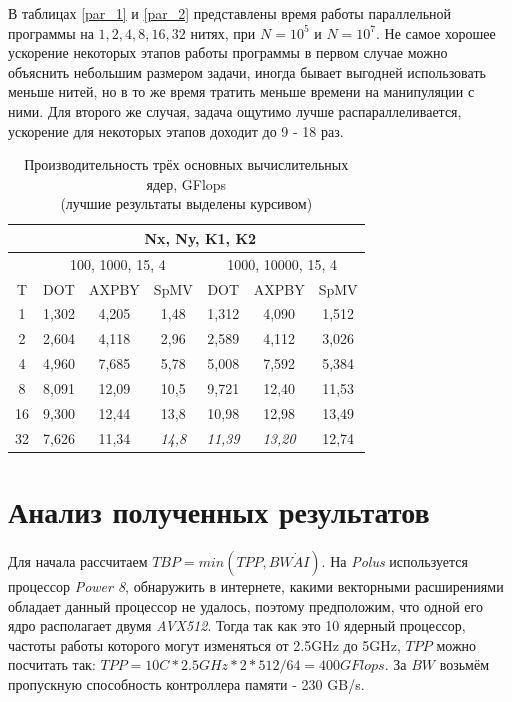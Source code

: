 		В таблицах \ref{par_1} и \ref{par_2} представлены время работы параллельной программы на \(1, 2, 4, 8, 16, 32\) нитях, при \(N = 10^5\) и \(N = 10^7\). Не самое хорошее ускорение некоторых этапов работы программы в первом случае можно объяснить небольшим размером задачи, иногда бывает выгодней использовать меньше нитей, но в то же время тратить меньше времени на манипуляции с ними. Для второго же случая, задача ощутимо лучше распараллеливается, ускорение для некоторых этапов доходит до 9 - 18 раз.
		\begin{table}[H]
			\begin{tabular}{|c||c|c|c|c|c|c|}
				\hline
				& \multicolumn{6}{|c|}{Nx, Ny, K1, K2} \\ \hline
				   & \multicolumn{3}{c|}{100, 1000, 15, 4} & \multicolumn{3}{c|}{1000, 10000, 15, 4} \\ \hline
				T  & DOT   & AXPBY &  SpMV &   DOT & AXPBY & SpMV \\ \hline
				1  & 1,302 & 4,205 & 1,48  & 1,312 & 4,090 & 1,512 \\ \hline
				2  & 2,604 & 4,118 & 2,96  & 2,589 & 4,112 & 3,026 \\ \hline
				4  & 4,960 & 7,685 & 5,78  & 5,008 & 7,592 & 5,384 \\ \hline
				8  & 8,091 & 12,09 & 10,5  & 9,721 & 12,40 & 11,53 \\ \hline
				16 & 9,300 & 12,44 & 13,8  & 10,98 & 12,98 & 13,49 \\ \hline
				32 & 7,626 & 11,34 & \textit{14,8}  & \textit{11,39} & \textit{13,20} & 12,74 \\ \hline
			\end{tabular}
			\caption{Производительность трёх основных вычислительных ядер, GFlops\\(лучшие результаты выделены курсивом)}
			\label{real_perf}
		\end{table}
\section{Анализ полученных результатов}
	Для начала рассчитаем \(TBP = min(TPP, BW \dot AI)\). На \textit{Polus} используется процессор \textit{Power 8}, обнаружить в интернете, какими векторными расширениями обладает данный процессор не удалось, поэтому предположим, что одной его ядро располагает двумя \textit{AVX512}. Тогда так как это 10 ядерный процессор, частоты работы которого могут изменяться от 2.5GHz  до 5GHz, \(TPP\) можно посчитать так: \(TPP = 10C * 2.5GHz * 2 * 512 / 64 = 400 GFlops\). За \(BW\) возьмём пропускную способность контроллера памяти - 230 GB/s.

